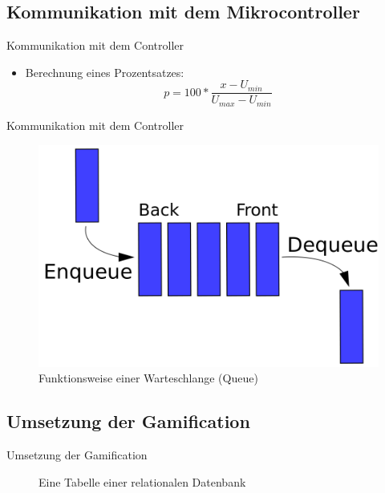 \documentclass[hyphens]{beamer}
\begin{document}
\subsection{Kommunikation mit dem Mikrocontroller}

\begin{frame}{Kommunikation mit dem Controller}
\begin{itemize}
	\item Berechnung eines Prozentsatzes:
	\begin{equation*}
	p = 100 * \frac{x - U_{min}}{U_{max} - U_{min}}
	\end{equation*}
\end{itemize}
\end{frame}

\begin{frame}{Kommunikation mit dem Controller}
	\begin{figure}
		\includegraphics[scale=0.28]{pics/queue}
		\caption{Funktionsweise einer Warteschlange (Queue)}
	\end{figure}
\end{frame}

\subsection{Umsetzung der Gamification}

\begin{frame}{Umsetzung der Gamification}
\begin{figure}
	
	\caption{Eine Tabelle einer relationalen Datenbank}
\end{figure}
\end{frame}
\end{document}
